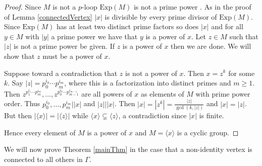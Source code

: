\documentclass[12pt]{report}
\theoremstyle{definition}
\newcommand{\Exp}{\text{Exp}}       %
\begin{document}
\begin{proof}
  Since $M$ is not a $p$-loop $\Exp(M)$ is not a prime power \cite{64and81}. As in the proof of
    Lemma \ref{connectedVertex} $|x|$ is divisible by every prime divisor of $\Exp(M)$. Since
    $\Exp(M)$ has at least two distinct prime factors so does $|x|$ and for all $y\in M$ with
    $|y|$ a prime power we have that $y$ is a power of $x$. Let $z\in M$ such that $|z|$ is not
    a prime power be given. If $z$ is a power of $x$ then we are done. We will show that $z$
    must be a power of $x$.

  Suppose toward a contradiction that $z$ is not a power of $x$. Then $x = z^k$ for some $k$.
    Say $|z| = p_0^{i_0}\cdots p_m^{i_m}$, where this is a factorization into distinct primes
    and $m\geq 1$. Then $z^{p_1^{i_1}\cdots p_m^{i_m}}, \ldots, z^{p_0^{i_0}\cdots p_{m - 1}^{i_{m - 1}}}$
    are all powers of $x$ as elements of $M$ with prime power order.
    Thus $p_0^{i_0}, \ldots, p_m^{i_m} | |x|$ and $|z| | |x|$. 
    Then $|x| = |z^k| = \frac{|z|}{\gcd(k, |z|)}$ and $|x| = |z|$. But then
    $|\langle x\rangle| = |\langle z\rangle|$ while $\langle x\rangle \subsetneq \langle z\rangle$,
    a contradiction since $|x|$ is finite.

  Hence every element of $M$ is a power of $x$ and $M = \langle x\rangle$ is a cyclic group.
\end{proof}

We will now prove Theorem \ref{mainThm} in the case that a non-identity vertex is connected to all
  others in $\Gamma$.
\end{document}
